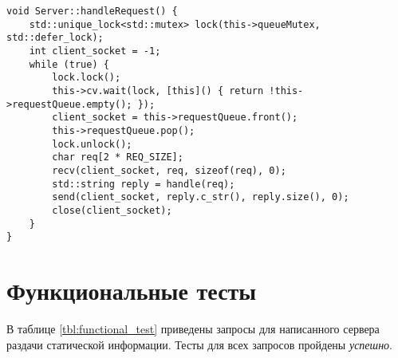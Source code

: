 \begin{center}
\captionsetup{justification=raggedright,singlelinecheck=off}
\begin{lstlisting}[label=lst:server_handle,caption=Алгоритм обработки запроса в потоке]
void Server::handleRequest() {
	std::unique_lock<std::mutex> lock(this->queueMutex, std::defer_lock);
	int client_socket = -1;
	while (true) {
		lock.lock();
		this->cv.wait(lock, [this]() { return !this->requestQueue.empty(); });
		client_socket = this->requestQueue.front();
		this->requestQueue.pop();
		lock.unlock();
		char req[2 * REQ_SIZE];
		recv(client_socket, req, sizeof(req), 0);
		std::string reply = handle(req);
		send(client_socket, reply.c_str(), reply.size(), 0);
		close(client_socket);
	}
}
\end{lstlisting}
\end{center}

\section{Функциональные тесты}

В таблице \ref{tbl:functional_test} приведены запросы для написанного сервера раздачи статической информации. Тесты для всех запросов пройдены \textit{успешно}.

